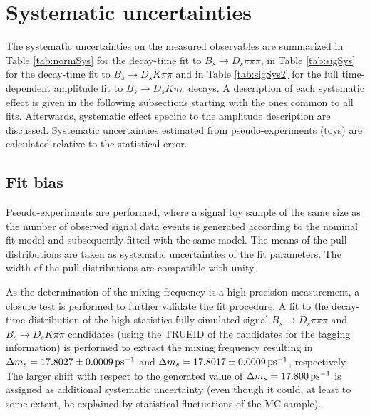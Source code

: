 \section{Systematic uncertainties}
\label{sec:Systematics}

The systematic uncertainties on the measured observables are summarized in Table \ref{tab:normSys} for the decay-time fit to $B_s \to D_s \pi\pi\pi$,
in Table \ref{tab:sigSys} for the decay-time fit to $B_s \to D_s K\pi\pi$
and in Table \ref{tab:sigSys2} for the full time-dependent amplitude fit to $B_s \to D_s K\pi\pi$ decays. 
A description of each systematic
effect is given in the following subsections
starting with the ones common to all fits.
Afterwards, systematic effect specific to the amplitude description are discussed.
Systematic uncertainties estimated from pseudo-experiments (toys) are calculated relative to the statistical error.


\subsection{Fit bias}
\label{subsec:SystFit}

Pseudo-experiments are performed, where a signal toy sample of the same size as the number of observed signal data events is generated according to the nominal fit model 
and subsequently fitted with the same model.
The means of the pull distributions are taken as systematic uncertainties of the fit parameters. The width of the pull distributions are compatible with unity.  

As the determination of the mixing frequency is a high precision measurement, 
a closure test is performed to further validate the fit procedure.
A fit to the decay-time distribution of the high-statistics fully simulated signal $B_s \to D_s \pi\pi\pi$ and $B_s \to D_s K\pi\pi$ candidates (using the \textsf{TRUEID} of the candidates for the tagging information) is performed to extract the mixing frequency  resulting in $\Delta m_s = 17.8027 \pm 0.0009 {\mathrm{ \,ps^{-1}}}$ and $\Delta m_s = 17.8017 \pm 0.0009 {\mathrm{ \,ps^{-1}}}$, respectively.
The larger shift with respect to the generated value of $\Delta m_s = 17.800{\mathrm{ \,ps^{-1}}}$ is assigned as additional systematic uncertainty (even though it could, at least to some extent, be explained by statistical fluctuations of the MC sample). 

